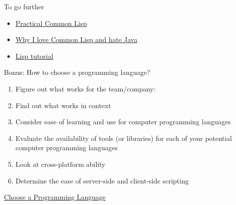 \documentclass[english,serif,mathserif,usenames,dvipsnames]{beamer}
\begin{document}
\begin{frame}{To go further}
\begin{itemize}
\item \href{http://gigamonkeys.com/book/}{Practical Common Lisp }
\item \href{http://kuomarc.wordpress.com/2012/01/27/why-i-love-common-lisp-and-hate-java/}{Why I love Common Lisp and hate Java}
\item \href{http://www.cs.sfu.ca/CourseCentral/310/pwfong/Lisp/1/tutorial1.html}{Lisp tutorial}
\end{itemize}
\end{frame}

\begin{frame}{Bonus: How to choose a programming language?}
\begin{enumerate}[<+->]
\item Figure out what works for the team/company: 
\item Find out what works in context
\item Consider ease of learning and use for computer programming languages
\item Evaluate the availability of tools (or libraries) for each of your potential computer programming languages
\item Look at cross-platform ability
\item Determine the ease of server-side and client-side scripting
\end{enumerate}
\tiny{\href{http://www.wikihow.com/Choose-a-Programming-Language}{Choose a Programming Language}}
\end{frame}
\end{document}
